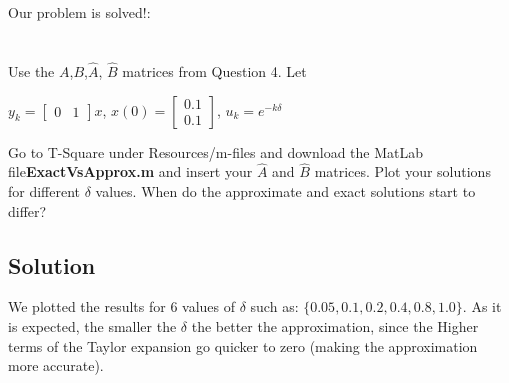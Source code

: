 \documentclass[10pt,a4paper]{article}
\begin{document}
Our problem is solved!:

\begin{center}
\end{center}



\section{}
Use the $A$,$B$,$\hat{A}$, $\hat{B}$ matrices from Question 4. Let

\begin{center}
$y_{k} = 
\begin{bmatrix}
0 & 1
\end{bmatrix}
x$, \hspace*{1cm}
$x(0)
=
\begin{bmatrix}
0.1 \\
0.1
\end{bmatrix}
$, \hspace*{1cm}
$u_{k} = e^{-k\delta}$
\end{center}

Go to T-Square under Resources/m-files and download the MatLab file\textbf{ExactVsApprox.m} and insert your $\hat{A}$ and $\hat{B}$ matrices. Plot your solutions for different $\delta$ values. When do the approximate and exact solutions start to differ?
\subsection*{Solution}
We plotted the results for 6 values of $\delta$ such as: $\{0.05, 0.1, 0.2, 0.4, 0.8, 1.0\}$. As it is expected, the smaller the $\delta$ the better the approximation, since the Higher terms of the Taylor expansion go quicker to zero (making the approximation more accurate).
\end{document}
